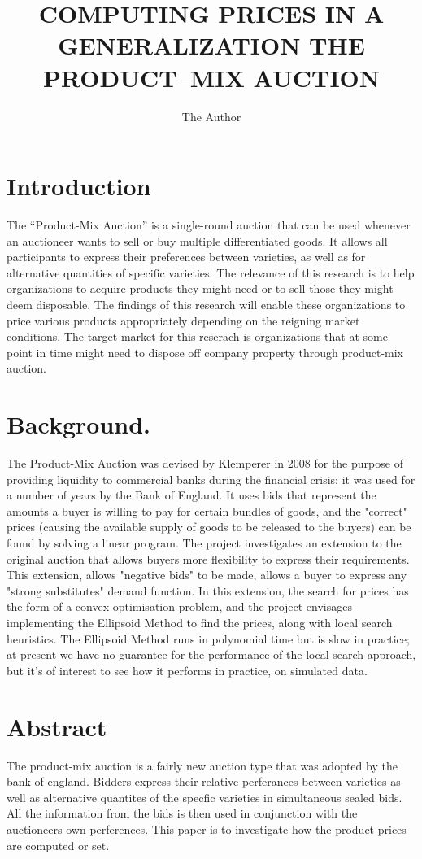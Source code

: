 \documentclass[11pt]{article} %
\title{COMPUTING PRICES IN A GENERALIZATION THE PRODUCT–MIX AUCTION}
\author{The Author}
\begin{document}
\maketitle

\section{Introduction}

The “Product-Mix Auction” is a single-round auction that can be used whenever an auctioneer wants to sell or buy multiple differentiated goods. It allows all participants to express their preferences between varieties, as well as for alternative quantities of specific varieties.
The relevance of this research is to help organizations to acquire products they might need or to sell those they might deem disposable. The findings of this research will enable these organizations to price various products appropriately depending on the reigning market conditions. The target market for this reserach is organizations that at some point in time might need to dispose off company property through product-mix auction.

\section{Background.}
The Product-Mix Auction was devised by Klemperer in 2008 for the purpose of providing liquidity to commercial banks during the financial crisis; it was used for a number of years by the Bank of England.
It uses bids that represent the amounts a buyer is willing to pay for certain bundles of goods, and the "correct" prices (causing the available supply of goods to be released to the buyers) can be found by solving a linear program. The project investigates an extension to the original auction that allows buyers more flexibility to express their requirements. 
This extension, allows "negative bids" to be made, allows a buyer to express any "strong substitutes" demand function. In this extension, the search for prices has the form of a convex optimisation problem, and the project envisages implementing the Ellipsoid Method to find the prices, along with local search heuristics. The Ellipsoid Method runs in polynomial time but is slow in practice; at present we have no guarantee for the performance of the local-search approach, but it's of interest to see how it performs in practice, on simulated data.

\section{Abstract}
The product-mix auction is a fairly new auction type that was adopted by the bank of england. 
Bidders express their relative perferances between varieties as well as alternative quantites of the specfic varieties in simultaneous sealed bids.
 All the information from the bids is then used in conjunction with the auctioneers own perferences. This paper is to investigate how the product prices are computed or set.
 
\end{document}
